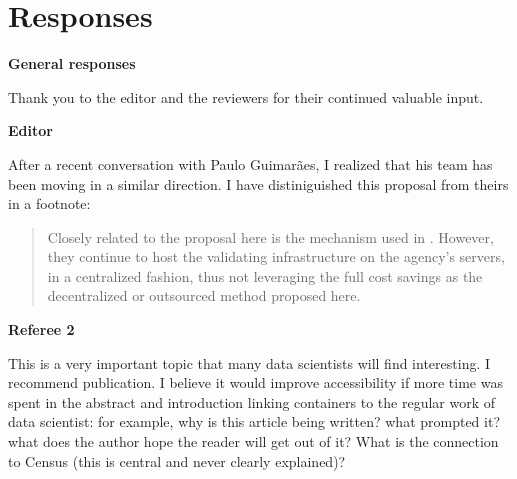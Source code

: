 \newpage
\section*{Responses}


\textbf{General responses}

\begin{response}
    Thank you to the editor and the reviewers for their continued valuable input.
\end{response}

\textbf{Editor}

\begin{response}
    After a recent conversation with Paulo Guimarães, I realized that his team has been moving in a similar direction. I have distiniguished this proposal from theirs in a footnote:

    \begin{quote}
        Closely related to the proposal here is the mechanism used in \citet{guimaraes_reproducibility_2023}. However, they continue to host the validating infrastructure on the agency's servers, in a centralized fashion, thus not leveraging the full cost savings as the decentralized or outsourced method proposed here.
    \end{quote}

\end{response}

\newpage

\textbf{Referee 2}

\begin{referee}
    This is a very important topic that many data scientists will find interesting. I recommend publication.
I believe it would improve accessibility if more time was spent in the abstract and introduction linking
containers to the regular work of data scientist: for example, why is this article being written? what
prompted it? what does the author hope the reader will get out of it? What is the connection to
Census (this is central and never clearly explained)?

\end{referee}

